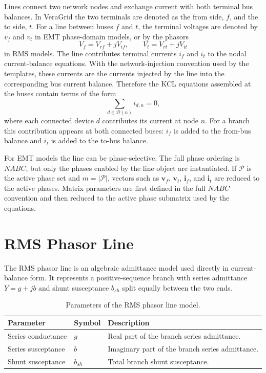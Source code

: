 Lines connect two network nodes and exchange current with both terminal bus balances. In VeraGrid the two terminals are denoted as the from side, $f$, and the to side, $t$. For a line between buses $f$ and $t$, the terminal voltages are denoted by $v_f$ and $v_t$ in EMT phase-domain models, or by the phasors
\begin{equation}
    V_f = V_{rf}+jV_{if}, \qquad V_t = V_{rt}+jV_{it}
\end{equation}
in RMS models. The line contributes terminal currents $i_f$ and $i_t$ to the nodal current-balance equations. With the network-injection convention used by the templates, these currents are the currents injected by the line into the corresponding bus current balance. Therefore the KCL equations assembled at the buses contain terms of the form
\begin{equation}
    \sum_{d \in \mathcal{D}(n)} i_{d,n} = 0,
\end{equation}
where each connected device $d$ contributes its current at node $n$. For a branch this contribution appears at both connected buses: $i_f$ is added to the from-bus balance and $i_t$ is added to the to-bus balance.

For EMT models the line can be phase-selective. The full phase ordering is $NABC$, but only the phases enabled by the line object are instantiated. If $\mathcal{P}$ is the active phase set and $m=|\mathcal{P}|$, vectors such as $\mathbf{v}_f$, $\mathbf{v}_t$, $\mathbf{i}_f$, and $\mathbf{i}_t$ are reduced to the active phases. Matrix parameters are first defined in the full $NABC$ convention and then reduced to the active phase submatrix used by the equations.

\section{RMS Phasor Line}

The RMS phasor line is an algebraic admittance model used directly in current-balance form. It represents a positive-sequence branch with series admittance $Y=g+jb$ and shunt susceptance $b_{sh}$ split equally between the two ends.

\begin{table}[h]
\centering
\begin{tabular}{p{}p{}p{}}
\hline
Parameter & Symbol & Description \\
\hline
Series conductance & $g$ & Real part of the branch series admittance. \\
Series susceptance & $b$ & Imaginary part of the branch series admittance. \\
Shunt susceptance & $b_{sh}$ & Total branch shunt susceptance. \\
\hline
\end{tabular}
\caption{Parameters of the RMS phasor line model.}
\end{table}

